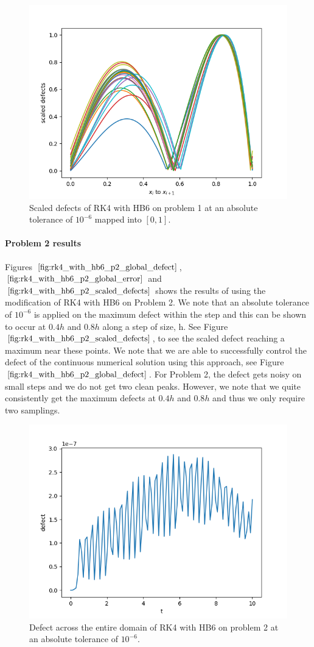 \documentclass{article}
\begin{document}
\begin{figure}[H]
\centering
\includegraphics[width=0.7\linewidth]{./figures/rk4_with_hb6_p1_scaled_defects}
\caption{Scaled defects of RK4 with HB6 on problem 1 at an absolute tolerance of $10^{-6}$ mapped into $[0, 1]$.}
\label{fig:rk4_with_hb6_p1_scaled_defects}
\end{figure}

\paragraph{Problem 2 results}
Figures $\ref{fig:rk4_with_hb6_p2_global_defect}$, $\ref{fig:rk4_with_hb6_p2_global_error}$ and $\ref{fig:rk4_with_hb6_p2_scaled_defects}$ shows the results of using the modification of RK4 with HB6 on Problem 2. We note that an absolute tolerance of $10^{-6}$ is applied on the maximum defect within the step and this can be shown to occur at $0.4h$ and $0.8h$ along a step of size, h. See Figure $\ref{fig:rk4_with_hb6_p2_scaled_defects}$, to see the scaled defect reaching a maximum near these points. We note that we are able to successfully control the defect of the continuous numerical solution using this approach, see Figure $\ref{fig:rk4_with_hb6_p2_global_defect}$. For Problem 2, the defect gets noisy on small steps and we do not get two clean peaks. However, we note that we quite consistently get the maximum defects at $0.4h$ and $0.8h$ and thus we only require two samplings.

\begin{figure}[H]
\centering
\includegraphics[width=0.7\linewidth]{./figures/rk4_with_hb6_p2_global_defect}
\caption{Defect across the entire domain of RK4 with HB6 on problem 2 at an absolute tolerance of $10^{-6}$.}
\label{fig:rk4_with_hb6_p2_global_defect}
\end{figure}
\end{document}
